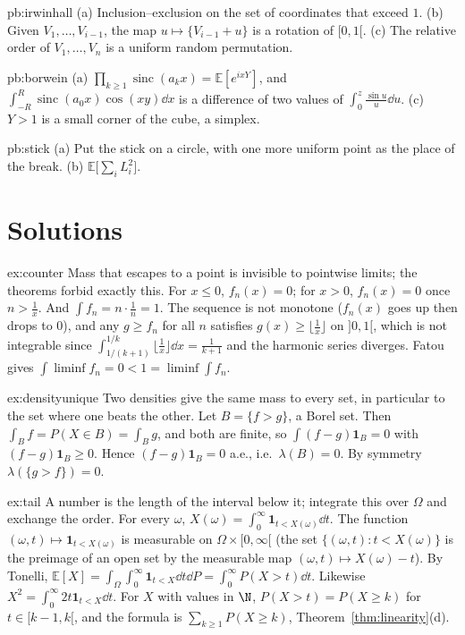 \begin{hint}{pb:irwinhall}
(a) Inclusion--exclusion on the set of coordinates that exceed $1$. (b) Given $V_1,\dots,V_{i-1}$, the map $u\mapsto\{V_{i-1}+u\}$ is a
rotation of $[0,1[$. (c) The relative order of $V_1,\dots,V_n$ is a uniform random permutation.
\end{hint}

\begin{hint}{pb:borwein}
(a) $\prod_{k\ge1}\operatorname{sinc}(a_kx)=\mathbb E[e^{ixY}]$, and $\int_{-R}^R\operatorname{sinc}(a_0x)\cos(xy)\dd x$ is a difference of two values of
$\int_0^z\frac{\sin u}u\dd u$. (c) $Y>1$ is a small corner of the cube, a simplex.
\end{hint}

\begin{hint}{pb:stick}
(a) Put the stick on a circle, with one more uniform point as the place of the break. (b) $\mathbb E\bigl[\sum_iL_i^2\bigr]$.
\end{hint}

\section{Solutions}

\begin{solution}{ex:counter}
\idea Mass that escapes to a point is invisible to pointwise limits; the theorems forbid exactly this.
\writeup For $x\le0$, $f_n(x)=0$; for $x>0$, $f_n(x)=0$ once $n>\frac1x$. And $\int f_n=n\cdot\frac1n=1$. The sequence is not monotone ($f_n(x)$ goes
up then drops to $0$), and any $g\ge f_n$ for all $n$ satisfies $g(x)\ge\lfloor\frac1x\rfloor$ on $]0,1[$, which is not integrable since
$\int_{1/(k+1)}^{1/k}\lfloor\frac1x\rfloor\dd x=\frac1{k+1}$ and the harmonic series diverges. Fatou gives $\int\liminf f_n=0<1=\liminf\int f_n$.
\end{solution}

\begin{solution}{ex:densityunique}
\idea Two densities give the same mass to every set, in particular to the set where one beats the other.
\writeup Let $B=\{f>g\}$, a Borel set. Then $\int_Bf=P(X\in B)=\int_Bg$, and both are finite, so $\int(f-g)\mathbf 1_B=0$ with $(f-g)\mathbf 1_B\ge0$. Hence
$(f-g)\mathbf 1_B=0$ a.e., i.e.\ $\lambda(B)=0$. By symmetry $\lambda(\{g>f\})=0$.
\end{solution}

\begin{solution}{ex:tail}
\idea A number is the length of the interval below it; integrate this over $\Omega$ and exchange the order.
\writeup For every $\omega$, $X(\omega)=\int_0^\infty\mathbf 1_{t<X(\omega)}\dd t$. The function $(\omega,t)\mapsto\mathbf 1_{t<X(\omega)}$ is measurable on $\Omega\times[0,\infty[$ (the set
$\{(\omega,t):t<X(\omega)\}$ is the preimage of an open set by the measurable map $(\omega,t)\mapsto X(\omega)-t$). By Tonelli,
$\mathbb E[X]=\int_\Omega\int_0^\infty\mathbf 1_{t<X}\dd t\dd P=\int_0^\infty P(X>t)\dd t$. Likewise $X^2=\int_0^\infty2t\mathbf 1_{t<X}\dd t$. For $X$ with values in $\N$,
$P(X>t)=P(X\ge k)$ for $t\in[k-1,k[$, and the formula is $\sum_{k\ge1}P(X\ge k)$, Theorem~\ref{thm:linearity}(d).
\end{solution}

